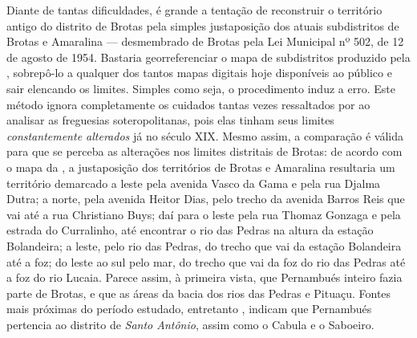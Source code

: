 Diante de tantas dificuldades, é grande a tentação de reconstruir o território antigo do distrito de Brotas pela simples justaposição dos atuais subdistritos de Brotas e Amaralina --- desmembrado de Brotas pela Lei Municipal nº 502, de 12 de agosto de 1954. Bastaria georreferenciar o mapa de subdistritos produzido pela , sobrepô-lo a qualquer dos tantos mapas digitais hoje disponíveis ao público e sair elencando os limites. Simples como seja, o procedimento induz a erro. Este método ignora completamente os cuidados tantas vezes ressaltados por  ao analisar as freguesias soteropolitanas, pois elas tinham seus limites \textit{constantemente alterados} já no século XIX. Mesmo assim, a comparação é válida para que se perceba as alterações nos limites distritais de Brotas: de acordo com o mapa da , a justaposição dos territórios de Brotas e Amaralina resultaria um território demarcado a leste pela avenida Vasco da Gama e pela rua Djalma Dutra; a norte, pela avenida Heitor Dias, pelo trecho da avenida Barros Reis que vai até a rua Christiano Buys; daí para o leste pela rua Thomaz Gonzaga e pela estrada do Curralinho, até encontrar o rio das Pedras na altura da estação Bolandeira; a leste, pelo rio das Pedras, do trecho que vai da estação Bolandeira até a foz; do leste ao sul pelo mar, do trecho que vai da foz do rio das Pedras até a foz do rio Lucaia. Parece assim, à primeira vista, que Pernambués inteiro fazia parte de Brotas, e que as áreas da bacia dos rios das Pedras e Pituaçu. Fontes mais próximas do período estudado, entretanto \cite{souza_guia_1935}, indicam que Pernambués pertencia ao distrito de \textit{Santo Antônio}, assim como o Cabula e o Saboeiro.